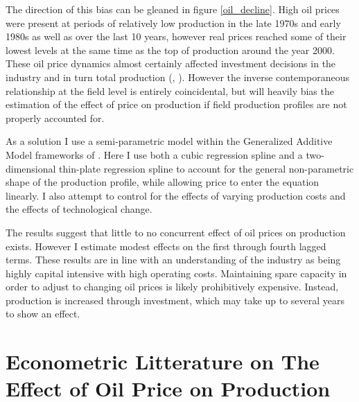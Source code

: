 \documentclass[12pt]{article}
\begin{document}
The direction of this bias can be gleaned in figure \ref{oil_decline}.  High oil prices were present at periods of relatively low production in the late 1970s and early 1980s as well as over the last 10 years, however real prices reached some of their lowest levels at the same time as the top of production around the year 2000. These oil price dynamics almost certainly affected investment decisions in the industry and in turn total production (\citep{osmundsen_is_2007}, \citep{aune_financial_2010}). However the inverse contemporaneous relationship at the field level is entirely coincidental, but will heavily bias the estimation of the effect of price on production if field production profiles are not properly accounted for. 

As a solution I use a semi-parametric model within the Generalized Additive Model frameworks of \cite{hastie_generalized_1990}.  Here I use both a cubic regression spline and a two-dimensional thin-plate regression spline to account for the general non-parametric shape of the production profile, while allowing price to enter the equation linearly. I also attempt to control for the effects of varying production costs and the effects of technological change.

The results suggest that little to no concurrent effect of oil prices on production exists.  However I estimate modest effects on the first through fourth lagged terms. These results are in line with an understanding of the industry as being highly capital intensive with high operating costs.  Maintaining spare capacity in order to adjust to changing oil prices is likely prohibitively expensive.  Instead, production is increased through investment, which may take up to several years to show an effect.

\section{Econometric Litterature on The Effect of Oil Price on Production}

\end{document}
